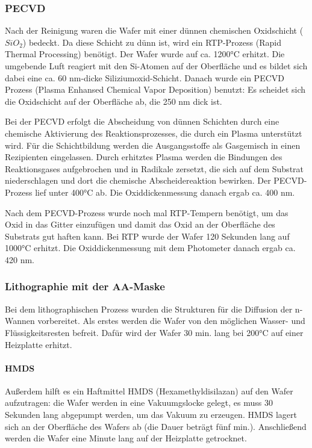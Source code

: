 \subsubsection[PECVD]{PECVD}

Nach der Reinigung waren die Wafer mit einer dünnen chemischen Oxidschicht ($SiO_2$)  bedeckt. Da diese Schicht zu dünn ist, wird ein RTP-Prozess (Rapid Thermal Processing) benötigt.  Der Wafer wurde auf ca. 1200°C erhitzt.  Die umgebende Luft reagiert mit den Si-Atomen auf der Oberfläche und es bildet sich dabei eine ca. 60 nm-dicke Siliziumoxid-Schicht. Danach wurde ein PECVD Prozess (Plasma Enhansed Chemical Vapor Deposition) benutzt: Es scheidet sich die Oxidschicht  auf der Oberfläche ab, die 250 nm dick ist.

Bei der PECVD erfolgt die Abscheidung von dünnen Schichten durch eine chemische Aktivierung des Reaktionsprozesses, die durch ein Plasma unterstützt wird.
Für die Schichtbildung werden die Ausgangsstoffe als Gasgemisch in einen Rezipienten eingelassen. Durch erhitztes Plasma werden die Bindungen des Reaktionsgases aufgebrochen und in Radikale zersetzt, die sich auf dem Substrat niederschlagen und dort die chemische Abscheidereaktion bewirken.
 Der PECVD-Prozess lief unter 400°C ab.
 Die Oxiddickenmessung danach ergab ca. 400 nm.

Nach dem PECVD-Prozess wurde noch mal RTP-Tempern benötigt, um das Oxid in das Gitter einzufügen und damit das Oxid an der Oberfläche des Substrats gut haften kann. Bei RTP wurde der Wafer 120 Sekunden  lang auf 1000°C erhitzt.
Die Oxiddickenmessung mit dem Photometer danach ergab ca. 420 nm.


\subsubsection[Lithographie mit der AA-Maske]{Lithographie mit der AA-Maske}

Bei dem lithographischen Prozess wurden die Strukturen für die Diffusion der n-Wannen vorbereitet.
Als erstes werden die Wafer von den möglichen Wasser- und Flüssigkeitsresten befreit. Dafür wird der Wafer 30 min. lang bei 200°C auf einer Heizplatte erhitzt.


\paragraph[HMDS]{HMDS}

Außerdem hilft es ein Haftmittel HMDS (Hexamethyldisilazan) auf den Wafer aufzutragen:
die Wafer werden in eine Vakuumgslocke gelegt, es muss 30 Sekunden lang abgepumpt werden, um das Vakuum zu erzeugen.
HMDS  lagert sich an der Oberfläche des Wafers ab (die Dauer beträgt fünf min.).
Anschließend werden die Wafer  eine Minute lang auf der Heizplatte getrocknet.


